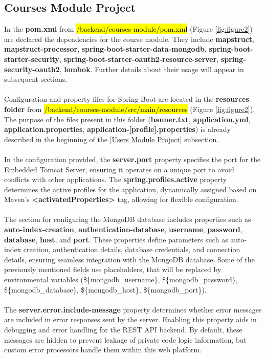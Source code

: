 \subsection{Courses Module Project}

\noindent In the \textbf{pom.xml} from \hl{/backend/courses-module/pom.xml} (Figure \ref{fig:figure2}) are declared the dependencies for the course module. They include \textbf{mapstruct}, \textbf{mapstruct-processor}, \textbf{spring-boot-starter-data-mongodb}, \textbf{spring-boot-starter-security}, \textbf{spring-boot-starter-oauth2-resource-server}, \textbf{spring-security-oauth2}, \textbf{lombok}. Further details about their usage will appear in subsequent sections.
\\\\
\noindent Configuration and property files for Spring Boot are located in the \textbf{resources folder} from \hl{/backend/courses-module/src/main/resources} (Figure \ref{fig:figure2}). The purpose of the files present in this folder (\textbf{banner.txt}, \textbf{application.yml}, \textbf{application.properties}, \textbf{application-[profile].properties}) is already described in the beginning of the \ref{Users Module Project} subsection.
\\\\
\noindent In the configuration provided, the \textbf{server.port} property specifies the port for the Embedded Tomcat Server, ensuring it operates on a unique port to avoid conflicts with other applications. The \textbf{spring.profiles.active} property determines the active profiles for the application, dynamically assigned based on Maven's \textbf{<activatedProperties>} tag, allowing for flexible configuration.
\\\\
\noindent The section for configuring the MongoDB database includes properties such as \textbf{auto-index-creation}, \textbf{authentication-database}, \textbf{username}, \textbf{password}, \textbf{database}, \textbf{host}, and \textbf{port}. These properties define parameters such as auto-index creation, authentication details, database credentials, and connection details, ensuring seamless integration with the MongoDB database. Some of the previously mentioned fields use placeholders, that will be replaced by environmental variables (\$\{mongodb\_username\}, \$\{mongodb\_password\}, \$\{mongodb\_database\}, \$\{mongodb\_host\}, \$\{mongodb\_port\}).
\\\\
\noindent The \textbf{server.error.include-message} property determines whether error messages are included in error responses sent by the server. Enabling this property aids in debugging and error handling for the REST API backend. By default, these messages are hidden to prevent leakage of private code logic information, but custom error processors handle them within this web platform.
